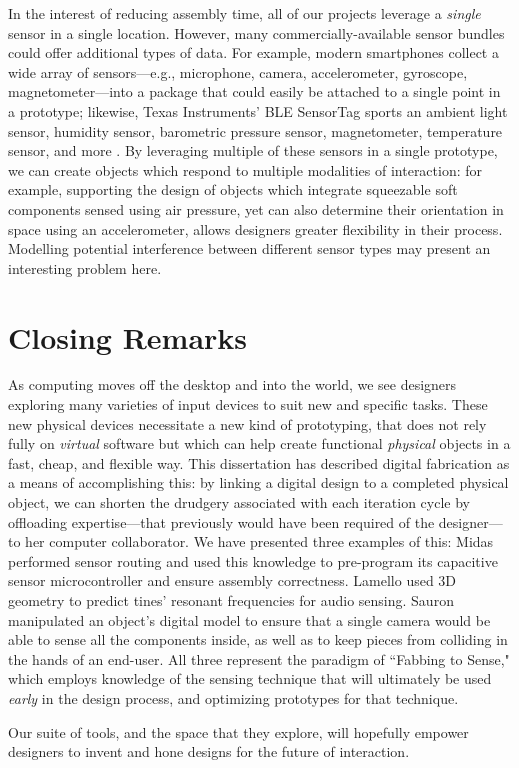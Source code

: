 In the interest of reducing assembly time, all of our projects leverage a \emph{single} sensor in a single location. However, many commercially-available sensor bundles could offer additional types of data. For example, modern smartphones collect a wide array of sensors---e.g., microphone, camera, accelerometer, gyroscope, magnetometer---into a package that could easily be attached to a single point in a prototype; likewise, Texas Instruments' BLE SensorTag sports an ambient light sensor, humidity sensor, barometric pressure sensor, magnetometer, temperature sensor, and more \cite{ti-sensortag}. By leveraging multiple of these sensors in a single prototype, we can create objects which respond to multiple modalities of interaction: for example, supporting the design of objects which integrate squeezable soft components sensed using air pressure, yet can also determine their orientation in space using an accelerometer, allows designers greater flexibility in their process. Modelling potential interference between different sensor types may present an interesting problem here.

\section{Closing Remarks}

As computing moves off the desktop and into the world, we see designers exploring many varieties of input devices to suit new and specific tasks. These new physical devices necessitate a new kind of prototyping, that does not rely fully on \emph{virtual} software but which can help create functional \emph{physical} objects in a fast, cheap, and flexible way. This dissertation has described digital fabrication as a means of accomplishing this: by linking a digital design to a completed physical object, we can shorten the drudgery associated with each iteration cycle by offloading expertise---that previously would have been required of the designer---to her computer collaborator. We have presented three examples of this: Midas performed sensor routing and used this knowledge to pre-program its capacitive sensor microcontroller and ensure assembly correctness. Lamello used 3D geometry to predict tines' resonant frequencies for audio sensing. Sauron manipulated an object's digital model to ensure that a single camera would be able to sense all the components inside, as well as to keep pieces from colliding in the hands of an end-user. All three represent the paradigm of ``Fabbing to Sense," which employs knowledge of the sensing technique that will ultimately be used \emph{early} in the design process, and optimizing prototypes for that technique.

Our suite of tools, and the space that they explore, will hopefully empower designers to invent and hone designs for the future of interaction.